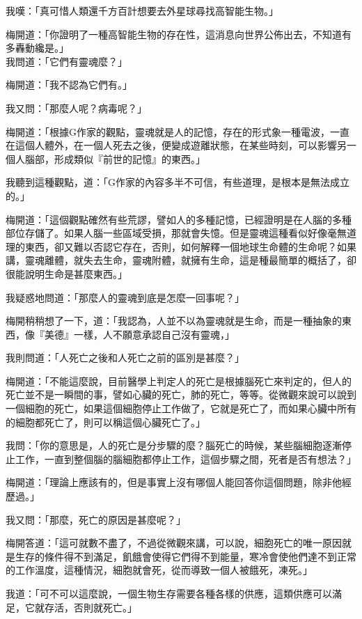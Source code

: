 我嘆：「真可惜人類還千方百計想要去外星球尋找高智能生物。」

梅開道：「你證明了一種高智能生物的存在性，這消息向世界公佈出去，不知道有多轟動纔是。」
\\


我問道：「它們有靈魂麼？」

梅開道：「我不認為它們有。」

我又問：「那麼人呢？病毒呢？」

梅開道：「根據G作家的觀點，靈魂就是人的記憶，存在的形式象一種電波，一直在這個人體外，在一個人死去之後，便變成遊離狀態，在某些時刻，可以影響另一個人腦部，形成類似『前世的記憶』的東西。」

我聽到這種觀點，道：「G作家的內容多半不可信，有些道理，是根本是無法成立的。」

梅開道：「這個觀點確然有些荒謬，譬如人的多種記憶，已經證明是在人腦的多種部位存儲了。如果人腦一些區域受損，那就會失憶。但是靈魂這種看似好像毫無道理的東西，卻又難以否認它存在，否則，如何解釋一個地球生命體的生命呢？如果講，靈魂離體，就失去生命，靈魂附體，就擁有生命，這是種最簡單的概括了，卻很能說明生命是甚麼東西。」

我疑惑地問道：「那麼人的靈魂到底是怎麼一回事呢？」

梅開稍稍想了一下，道：「我認為，人並不以為靈魂就是生命，而是一種抽象的東西，像『美德』一樣，人不願意承認自己沒有靈魂，」

我則問道：「人死亡之後和人死亡之前的區別是甚麼？」

梅開道：「不能這麼說，目前醫學上判定人的死亡是根據腦死亡來判定的，但人的死亡並不是一瞬間的事，譬如心臟的死亡，肺的死亡，等等。從微觀來說可以說到一個細胞的死亡，如果這個細胞停止工作做了，它就是死亡了，而如果心臟中所有的細胞都死亡了，則可以稱這個心臟死亡了。」

我問：「你的意思是，人的死亡是分步驟的麼？腦死亡的時候，某些腦細胞逐漸停止工作，一直到整個腦的腦細胞都停止工作，這個步驟之間，死者是否有想法？」

梅開道：「理論上應該有的，但是事實上沒有哪個人能回答你這個問題，除非他經歷過。」

我又問：「那麼，死亡的原因是甚麼呢？」

梅開答道：「這可就數不盡了，不過從微觀來講，可以說，細胞死亡的唯一原因就是生存的條件得不到滿足，飢餓會使得它們得不到能量，寒冷會使他們達不到正常的工作溫度，這種情況，細胞就會死，從而導致一個人被餓死，凍死。」

我道：「可不可以這麼說，一個生物生存需要各種各樣的供應，這類供應可以滿足，它就存活，否則就死亡。」

